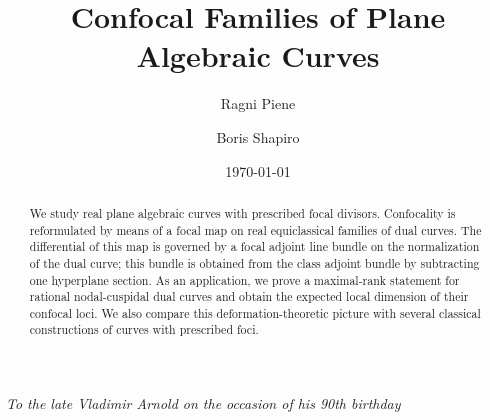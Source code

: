 \documentclass[11pt]{amsart}
\theoremstyle{definition}
\theoremstyle{remark}
\begin{document}
\title{Confocal Families of Plane Algebraic Curves}


\author[R.~Piene]{Ragni Piene}
\address{Ragni Piene\\Department of Mathematics\\
University of Oslo\\P.O.Box 1053 Blindern\\NO-0316 Oslo\\Norway}

\author[B. Shapiro]{Boris Shapiro}
\address{Boris Shapiro\\Department of Mathematics\\Stockholm University\\SE-10691\\Stockholm\\Sweden}


\date{\today}

\begin{abstract}
We study real plane algebraic curves with prescribed focal divisors.  Confocality is reformulated by means of a focal map on real equiclassical families of dual curves.  The differential of this map is governed by a focal adjoint line bundle on the normalization of the dual curve; this bundle is obtained from the class adjoint bundle by subtracting one hyperplane section.  As an application, we prove a maximal-rank statement for rational nodal-cuspidal dual curves and obtain the expected local dimension of their confocal loci.  We also compare this deformation-theoretic picture with several classical constructions of curves with prescribed foci.
\end{abstract}



\maketitle

\centerline{\emph{To the late Vladimir Arnold on the occasion of his 90th birthday}}
\end{document}
